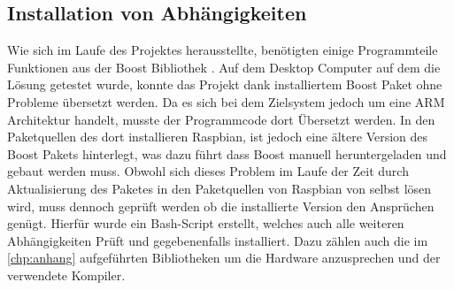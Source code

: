 \subsection{Installation von Abhängigkeiten}\label{kap:ums:abh}
Wie sich im Laufe des Projektes herausstellte, benötigten einige Programmteile Funktionen aus der Boost Bibliothek \cite{BOOK:BOOST}. Auf dem Desktop Computer auf dem die Lösung getestet wurde, konnte das Projekt dank installiertem Boost Paket ohne Probleme übersetzt werden. Da es sich bei dem  Zielsystem jedoch um eine ARM Architektur handelt, musste der Programmcode dort Übersetzt werden. In den Paketquellen des dort installieren Raspbian, ist jedoch eine ältere Version des Boost Pakets hinterlegt, was dazu führt dass Boost manuell heruntergeladen und gebaut werden muss. Obwohl sich dieses Problem im Laufe der Zeit durch Aktualisierung des Paketes in den Paketquellen von Raspbian von selbst lösen wird, muss dennoch geprüft werden ob die installierte Version den Ansprüchen genügt. Hierfür wurde ein Bash-Script erstellt, welches auch alle weiteren Abhängigkeiten Prüft und gegebenenfalls installiert. Dazu zählen auch die im  \autoref{chp:anhang} aufgeführten Bibliotheken um die Hardware anzusprechen und der verwendete Kompiler. 

\clearpage


